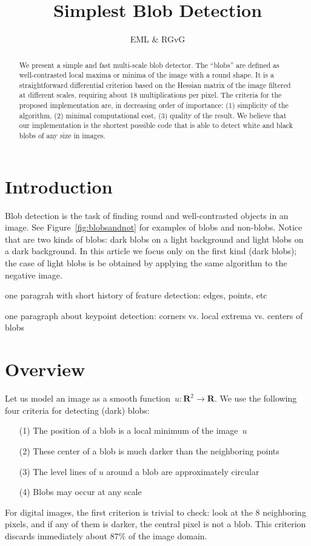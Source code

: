\documentclass[a4paper]{article}
\title{Simplest Blob Detection}
\author{EML \& RGvG}
\def\R{\mathbf{R}}
\begin{document}
\maketitle
\begin{abstract}
	We present a simple and fast multi-scale blob detector.
	The ``blobs'' are defined as well-contrasted local maxima or minima of
	the image with a round shape.
	It is a straightforward differential criterion based on the Hessian
	matrix of the image filtered at different scales, requiring about 18
	multiplications per pixel.
	The criteria for the proposed implementation are, in decreasing order
	of importance: (1) simplicity of the algorithm, (2) minimal
	computational cost, (3) quality of the result.
	We believe that our implementation is the shortest possible code that
	is able to detect white and black blobs of any size in images.
\end{abstract}

\section{Introduction}

Blob detection is the task of finding round and well-contrasted objects in an
image.  See Figure~\ref{fig:blobsandnot} for examples of blobs and non-blobs.
Notice that are two kinds of blobs: dark blobs on a light background and light
blobs on a dark background.  In this article we focus only on the first kind
(dark blobs); the case of light blobs is be obtained by applying the same
algorithm to the negative image.

one paragrah with short history of feature detection: edges, points, etc

one paragraph about keypoint detection: corners vs. local extrema vs. centers
of blobs

\section{Overview}

Let us model an image as a smooth function~$u:\R^2\to\R$.
We use the following four criteria for detecting (dark) blobs:
\begin{enumerate}
	\item[(1)] The position of a blob is a local minimum of the image~$u$
	\item[(2)] These center of a blob is much darker than the neighboring points
	\item[(3)] The level lines of $u$ around a blob are approximately circular
	\item[(4)] Blobs may occur at any scale
\end{enumerate}
For digital images, the first criterion is trivial to check: look at the
8 neighboring pixels, and if any of them is darker, the central pixel is not a
blob.  This criterion discards immediately about $87\%$ of the image domain.
\end{document}
